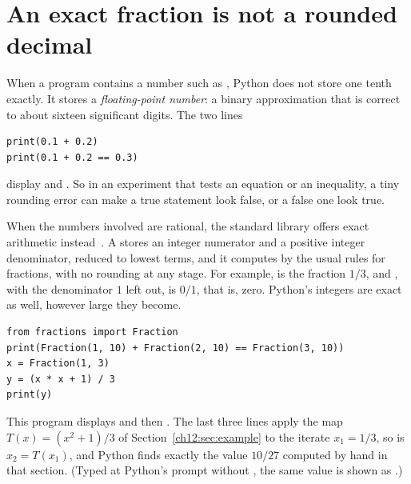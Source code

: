 \section{An exact fraction is not a rounded decimal}\label{appB:sec:fractions}
When a program contains a number such as , Python does not store one tenth exactly. It stores a \emph{floating-point number}: a binary approximation that is correct to about sixteen significant digits. The two lines
\par\noindent\begin{minipage}{\linewidth}
\begin{lstlisting}
print(0.1 + 0.2)
print(0.1 + 0.2 == 0.3)
\end{lstlisting}
\end{minipage}\par
display  and . So in an experiment that tests an equation or an inequality, a tiny rounding error can make a true statement look false, or a false one look true.

When the numbers involved are rational, the standard library offers exact arithmetic instead~\cite{pyfractions}. A  stores an integer numerator and a positive integer denominator, reduced to lowest terms, and it computes by the usual rules for fractions, with no rounding at any stage. For example,  is the fraction $1/3$, and , with the denominator $1$ left out, is $0/1$, that is, zero. Python's integers are exact as well, however large they become.
\par\noindent\begin{minipage}{\linewidth}
\begin{lstlisting}
from fractions import Fraction
print(Fraction(1, 10) + Fraction(2, 10) == Fraction(3, 10))
x = Fraction(1, 3)
y = (x * x + 1) / 3
print(y)
\end{lstlisting}
\end{minipage}\par
This program displays  and then . The last three lines apply the map $T(x)=(x^2+1)/3$ of Section~\ref{ch12:sec:example} to the iterate $x_1=1/3$, so  is $x_2=T(x_1)$, and Python finds exactly the value $10/27$ computed by hand in that section. (Typed at Python's prompt without , the same value is shown as .)

